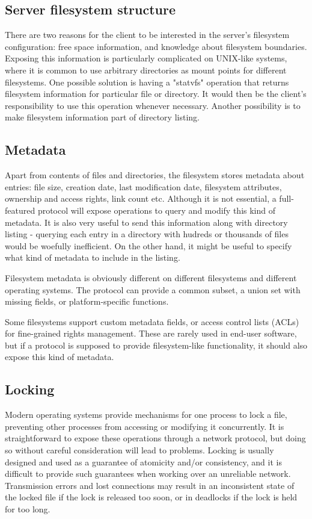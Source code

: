 \subsection{Server filesystem structure}

There are two reasons for the client to be interested in the server's filesystem configuration: free space
information, and knowledge about filesystem boundaries. Exposing this information is particularly complicated
on UNIX-like systems, where it is common to use arbitrary directories as mount points for different
filesystems. One possible solution is having a "statvfs"\cite{statvfs} operation that returns filesystem
information for particular file or directory. It would then be the client's responsibility to use this
operation whenever necessary. Another possibility is to make filesystem information part of directory listing.

\subsection{Metadata}

Apart from contents of files and directories, the filesystem stores metadata about entries: file size,
creation date, last modification date, filesystem attributes, ownership and access rights, link count etc.
Although it is not essential, a full-featured protocol will expose operations to query and modify this kind of
metadata. It is also very useful to send this information along with directory listing - querying each entry
in a directory with hudreds or thousands of files would be woefully inefficient. On the other hand, it might
be useful to specify what kind of metadata to include in the listing.

Filesystem metadata is obviously different on different filesystems and different operating systems. The
protocol can provide a common subset, a union set with missing fields, or platform-specific functions.

Some filesystems support custom metadata fields, or access control lists (ACLs) for fine-grained rights
management. These are rarely used in end-user software, but if a protocol is supposed to provide
filesystem-like functionality, it should also expose this kind of metadata.

\subsection{Locking}

Modern operating systems provide mechanisms for one process to lock a file, preventing other processes from
accessing or modifying it concurrently. It is straightforward to expose these operations through a network
protocol, but doing so without careful consideration will lead to problems. Locking is usually designed and
used as a guarantee of atomicity and/or consistency, and it is difficult to provide such guarantees when
working over an unreliable network. Transmission errors and lost connections may result in an inconsistent
state of the locked file if the lock is released too soon, or in deadlocks if the lock is held for too long.

